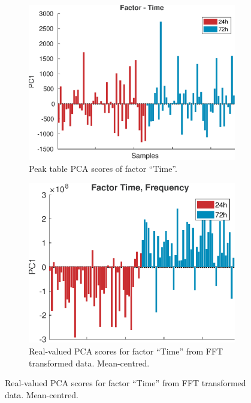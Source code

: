 \documentclass[preprint,12pt]{elsarticle}
\providecommand{\DIFaddbeginFL}{} %
\providecommand{\DIFaddendFL}{} %
\providecommand{\DIFdelbeginFL}{} %
\providecommand{\DIFdelendFL}{} %
\begin{document}
\begin{figure}[hbtp!]
    \centering
    \begin{subfigure}[b]{0.45\textwidth}
        \centering
        \DIFdelbeginFL %
\DIFdelendFL \DIFaddbeginFL \includegraphics[width=\textwidth]{peak_time.eps}
        \DIFaddendFL \caption{Peak table PCA scores of factor ``Time''.}
        \label{fig:figure1}
    \end{subfigure}
    \hfill
    \begin{subfigure}[b]{0.45\textwidth}
        \centering
        \DIFdelbeginFL %
\DIFdelendFL \DIFaddbeginFL \includegraphics[width=\textwidth]{freq_time_mn.eps}
        \DIFaddendFL \caption{Real-valued PCA scores for factor ``Time'' from FFT transformed data. Mean-centred.}
        \label{fig:figure2}
    \end{subfigure}


\end{figure}
\end{document}
